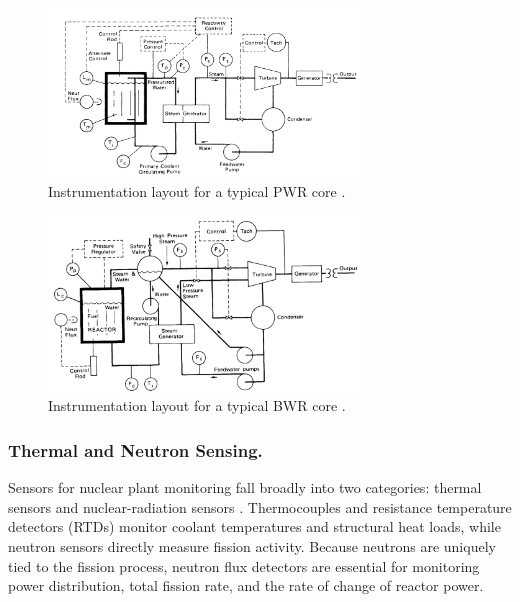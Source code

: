 \documentclass[12pt]{article}
\begin{document}
\begin{figure}[H]
  \centering
  \includegraphics[width=0.75\textwidth]{instrumentation}
  \caption{Instrumentation layout for a typical PWR core \cite{nuctech}.}
  \label{fig:coreinstrumentation}
\end{figure}

\begin{figure}[H]
  \centering
  \includegraphics[width=0.75\textwidth]{bwr}
  \caption{Instrumentation layout for a typical BWR core \cite{nuctech}.}
  \label{fig:bwrinstrumentation}
\end{figure}

\subsubsection*{Thermal and Neutron Sensing.}
Sensors for nuclear plant monitoring fall broadly into two categories: thermal sensors and nuclear-radiation sensors \cite{ichandbook}. Thermocouples and resistance temperature detectors (RTDs) monitor coolant temperatures and structural heat loads, while neutron sensors directly measure fission activity. Because neutrons are uniquely tied to the fission process, neutron flux detectors are essential for monitoring power distribution, total fission rate, and the rate of change of reactor power.
\end{document}
